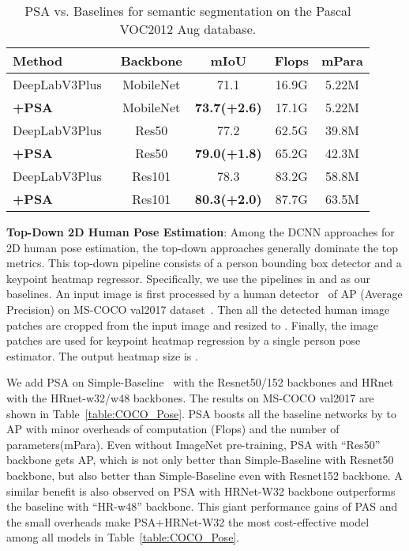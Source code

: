 \documentclass[10pt,twocolumn,letterpaper]{article}
\begin{document}
\begin{table}[!htb]
\centering
\fontsize{7}{8}\selectfont
\setlength{\tabcolsep}{5.6pt}
\begin{tabular}{l|c|c|c|c}
\hline
Method       & Backbone & mIoU  & Flops  & mPara  \\ \hline \hline
DeepLabV3Plus~\cite{Chen17} & MobileNet  &71.1 &16.9G & 5.22M\\
\textbf{+PSA}      & MobileNet     & \textbf{73.7(+2.6)} & 17.1G & 5.22M  \\
\hline
DeepLabV3Plus~\cite{Chen17} & Res50  &77.2 &62.5G &39.8M\\
\textbf{+PSA}     & Res50   & \textbf{79.0(+1.8)} & 65.2G & 42.3M  \\
\hline
DeepLabV3Plus~\cite{Chen17} & Res101 &78.3 &83.2G &58.8M\\
\textbf{+PSA}      & Res101    & \textbf{80.3(+2.0)} & 87.7G & 63.5M  \\
\hline 
\end{tabular}
\caption{ PSA vs. Baselines for semantic segmentation on the Pascal VOC2012 Aug database. }
\label{table:VOC_Semantic}
\end{table}

\textbf{Top-Down 2D Human Pose Estimation}: Among the DCNN approaches for 2D human pose estimation, the top-down approaches generally dominate the top metrics. This top-down pipeline consists of a person bounding box detector and a keypoint heatmap regressor. Specifically, we use the pipelines in \cite{Xiao18} and \cite{Sun2019} as our baselines. An input image is first processed by a human detector~\cite{Xiao18} of AP (Average Precision)  on MS-COCO val2017 dataset~\cite{Lin2014COCO}. Then all the detected human image patches are cropped from the input image and resized to . Finally, the  image patches are used for keypoint heatmap regression by a single person pose estimator. The output heatmap size is .

We add PSA on Simple-Baseline~\cite{Xiao18} with the Resnet50/152 backbones and HRnet~\cite{Sun2019} with the HRnet-w32/w48 backbones. The results on MS-COCO val2017 are shown in Table~\ref{table:COCO_Pose}. PSA boosts all the baseline networks by  to  AP with minor overheads of computation (Flops) and the number of parameters(mPara). Even without ImageNet pre-training, PSA with ``Res50'' backbone gets  AP, which is not only  better than Simple-Baseline with Resnet50 backbone, but also better than Simple-Baseline even with Resnet152 backbone. A similar benefit is also observed on PSA with HRNet-W32 backbone outperforms the baseline with ``HR-w48'' backbone. This giant performance gains of PAS and the small overheads make PSA+HRNet-W32 the most cost-effective model among all models in Table~\ref{table:COCO_Pose}. 
\end{document}
